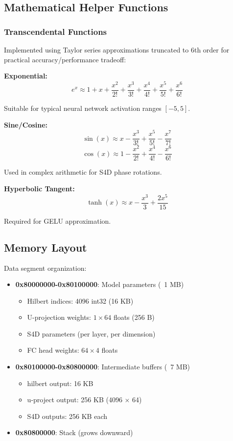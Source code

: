 \documentclass[conference]{IEEEtran}
\begin{document}
\subsection{Mathematical Helper Functions}

\subsubsection{Transcendental Functions}

Implemented using Taylor series approximations truncated to 6th order for practical accuracy/performance tradeoff:

\textbf{Exponential:}
$$e^x \approx 1 + x + \frac{x^2}{2!} + \frac{x^3}{3!} + \frac{x^4}{4!} + \frac{x^5}{5!} + \frac{x^6}{6!}$$

Suitable for typical neural network activation ranges $[-5, 5]$.

\textbf{Sine/Cosine:}
$$\sin(x) \approx x - \frac{x^3}{3!} + \frac{x^5}{5!} - \frac{x^7}{7!}$$
$$\cos(x) \approx 1 - \frac{x^2}{2!} + \frac{x^4}{4!} - \frac{x^6}{6!}$$

Used in complex arithmetic for S4D phase rotations.

\textbf{Hyperbolic Tangent:}
$$\tanh(x) \approx x - \frac{x^3}{3} + \frac{2x^5}{15}$$

Required for GELU approximation.

\subsection{Memory Layout}

Data segment organization:
\begin{itemize}
    \item \textbf{0x80000000-0x80100000}: Model parameters (~1 MB)
        \begin{itemize}
            \item Hilbert indices: 4096 int32 (16 KB)
            \item U-projection weights: $1 \times 64$ floats (256 B)
            \item S4D parameters (per layer, per dimension)
            \item FC head weights: $64 \times 4$ floats
        \end{itemize}
    \item \textbf{0x80100000-0x80800000}: Intermediate buffers (~7 MB)
        \begin{itemize}
            \item hilbert output: 16 KB
            \item u-project output: 256 KB (4096 × 64)
            \item S4D outputs: 256 KB each
        \end{itemize}
    \item \textbf{0x80800000}: Stack (grows downward)
\end{itemize}
\end{document}
